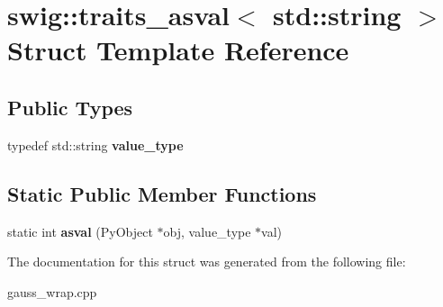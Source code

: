 \hypertarget{structswig_1_1traits__asval_3_01std_1_1string_01_4}{\section{swig\-:\-:traits\-\_\-asval$<$ std\-:\-:string $>$ Struct Template Reference}
\label{structswig_1_1traits__asval_3_01std_1_1string_01_4}
}
\subsection*{Public Types}
\begin{DoxyCompactItemize}
\item 
\hypertarget{structswig_1_1traits__asval_3_01std_1_1string_01_4_a66eab9ad087e2527eb509f04e6e70d75}{typedef std\-::string {\bfseries value\-\_\-type}}\label{structswig_1_1traits__asval_3_01std_1_1string_01_4_a66eab9ad087e2527eb509f04e6e70d75}

\end{DoxyCompactItemize}
\subsection*{Static Public Member Functions}
\begin{DoxyCompactItemize}
\item 
\hypertarget{structswig_1_1traits__asval_3_01std_1_1string_01_4_a1b4d91079cc3870021fac8f5514404ff}{static int {\bfseries asval} (Py\-Object $\ast$obj, value\-\_\-type $\ast$val)}\label{structswig_1_1traits__asval_3_01std_1_1string_01_4_a1b4d91079cc3870021fac8f5514404ff}

\end{DoxyCompactItemize}


The documentation for this struct was generated from the following file\-:\begin{DoxyCompactItemize}
\item 
gauss\-\_\-wrap.\-cpp\end{DoxyCompactItemize}
